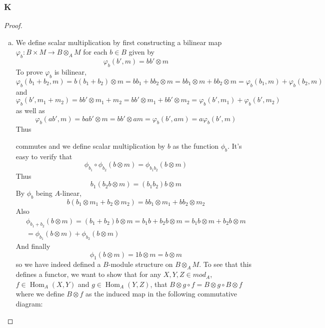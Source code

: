 \documentclass{article}
\DeclareMathOperator{\Hom}{Hom}
\begin{document}
\subsubsection{K}\label{1.3.K}
\begin{proof}
    \begin{enumerate}[(a)]
        \item 

        We define scalar multiplication by first constructing a bilinear map $\varphi_b:B\times M\to B\otimes_A M$ for each $b\in B$ given by 
    \[
    \varphi_b(b',m)=bb'\otimes m
    \]
    To prove $\varphi_b$ is bilinear,
    \[
    \varphi_b(b_1+b_2,m)=b(b_1+b_2)\otimes m=bb_1+bb_2\otimes m=bb_1\otimes m+bb_2\otimes m=\varphi_b(b_1,m)+\varphi_b(b_2,m)
    \]
    and
    \[
    \varphi_b(b',m_1+m_2)=bb'\otimes m_1+m_2=bb'\otimes m_1+bb'\otimes m_2=\varphi_b(b',m_1)+\varphi_b(b',m_2)
    \]
    as well as
    \[
    \varphi_b(ab',m)=bab'\otimes m=bb'\otimes am=\varphi_b(b',am)=a\varphi_b(b',m)
    \]
    Thus
    \begin{center}
    \end{center}
    commutes and we define scalar multiplication by $b$ as the function $\phi_b$. It's easy to verify that
    \[
    \phi_{b_1}\circ \phi_{b_2}(b\otimes m)=\phi_{b_1b_2}(b\otimes m)
    \]
    Thus
    \[
    b_1(b_2 b\otimes m)=(b_1 b_2) b\otimes m
    \]
    By $\phi_b$ being $A$-linear,
    \[
    b(b_1\otimes m_1+b_2\otimes m_2)=b b_1\otimes m_1+b b_2\otimes m_2
    \]
    Also
    \begin{align*}
        \phi_{b_1+b_2}(b\otimes m)=(b_1+b_2)b\otimes m=b_1b+b_2b\otimes m=b_1b\otimes m+b_2b\otimes m\\
        =\phi_{b_1}(b\otimes m)+\phi_{b_2}(b\otimes m)
    \end{align*}
    And finally
    \[
    \phi_1(b\otimes m)=1b\otimes m=b\otimes m
    \]
    so we have indeed defined a $B$-module structure on $B\otimes_A M$. To see that this defines a functor, we want to show that for any $X,Y,Z\in mod_A$, $f\in \Hom_A(X,Y)$ and $g\in \Hom_A(Y,Z)$, that $B\otimes g\circ f=B\otimes g\circ B\otimes f$ where we define $B\otimes f$ as the induced map in the following commutative diagram:
    \begin{center}

\end{center}
\end{enumerate}
\end{proof}
\end{document}
